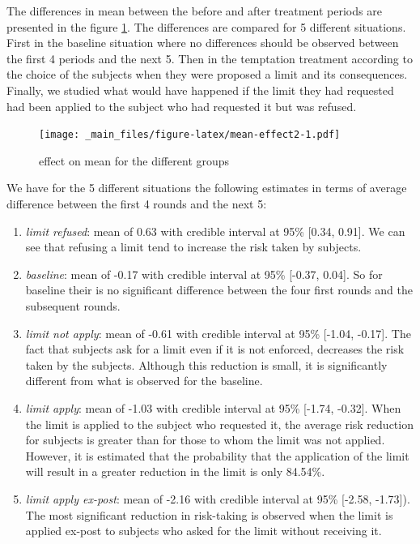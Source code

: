 \documentclass[
]{book}
\providecommand{\tightlist}{%
  \setlength{\itemsep}{0pt}\setlength{\parskip}{0pt}}
\begin{document}
The differences in mean between the before and after treatment periods are
presented in the figure \ref{fig:mean-effect2}.
The differences are compared for 5 different situations.
First in the baseline situation where no differences should be observed between
the first 4 periods and the next 5.
Then in the temptation treatment according to the choice of the subjects when
they were proposed a limit and its consequences.
Finally, we studied what would have happened if the limit they had requested had
been applied to the subject who had requested it but was refused.

\begin{figure}
\centering
\texttt{[image: \_main\_files/figure-latex/mean-effect2-1.pdf]}
\caption{\label{fig:mean-effect2}effect on mean for the different groups}
\end{figure}

We have for the 5 different situations the following estimates in terms of
average difference between the first 4 rounds and the next 5:

\begin{enumerate}
\def\labelenumi{\arabic{enumi}.}
\tightlist
\item
  \emph{limit refused}: mean of 0.63
  with credible interval at 95\% {[}0.34, 0.91{]}.
  We can see that refusing a limit tend to increase the risk taken by subjects.
\item
  \emph{baseline}: mean of -0.17
  with credible interval at 95\% {[}-0.37, 0.04{]}.
  So for baseline their is no significant difference between the four first
  rounds and the subsequent rounds.
\item
  \emph{limit not apply}: mean of -0.61
  with credible interval at 95\% {[}-1.04, -0.17{]}.
  The fact that subjects ask for a limit even if it is not enforced, decreases the
  risk taken by the subjects.
  Although this reduction is small, it is significantly different from what is
  observed for the baseline.
\item
  \emph{limit apply}: mean of -1.03
  with credible interval at 95\% {[}-1.74, -0.32{]}.
  When the limit is applied to the subject who requested it, the average risk
  reduction for subjects is greater than for those to whom the limit was not
  applied.
  However, it is estimated that the probability that the application of the limit
  will result in a greater reduction in the limit is only
  84.54\%.
\item
  \emph{limit apply ex-post}: mean of -2.16
  with credible interval at 95\% {[}-2.58, -1.73{]}).
  The most significant reduction in risk-taking is observed when the limit is
  applied ex-post to subjects who asked for the limit without receiving it.
\end{enumerate}
\end{document}
